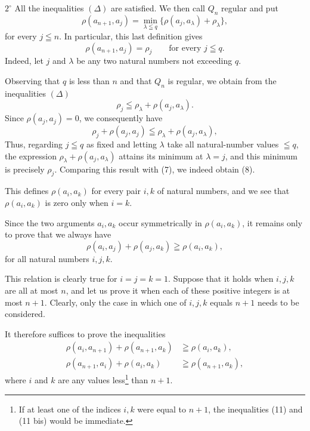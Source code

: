 \documentclass[a4paper,12pt]{amsart}
\newcommand{\srcpage}[1]{} %
\begin{document}
$2^\circ$ All the inequalities $(\Delta)$ are satisfied. We then call $Q_n$ regular and put
\begin{equation}\tag{7}
\rho(a_{n+1},a_j)=\min_{\lambda\leqq q}\{\rho(a_j,a_\lambda)+\rho_\lambda\},
\end{equation}
for every $j\leqq n$. In particular, this last definition gives
\begin{equation}\tag{8}
\rho(a_{n+1},a_j)=\rho_j\qquad\text{for every }j\leqq q.
\end{equation}
Indeed, let $j$ and $\lambda$ be any two natural numbers not exceeding $q$.

Observing that $q$ is less than $n$ and that $Q_n$ is regular, we obtain from the inequalities $(\Delta)$
\begin{equation}\tag{9}
\rho_j\leqq\rho_\lambda+\rho(a_j,a_\lambda).
\end{equation}
Since $\rho(a_j,a_j)=0$, we consequently have
\begin{equation}\tag{9 bis}
\rho_j+\rho(a_j,a_j)\leqq\rho_\lambda+\rho(a_j,a_\lambda),
\end{equation}
Thus, regarding $j\leqq q$ as fixed and letting $\lambda$ take all natural-number values $\leqq q$, the expression $\rho_\lambda+\rho(a_j,a_\lambda)$ attains its minimum at $\lambda=j$, and this minimum is precisely $\rho_j$. Comparing this result with (7), we indeed obtain (8).

This defines $\rho(a_i,a_k)$ for every pair $i,k$ of natural numbers, and we see that $\rho(a_i,a_k)$ is zero only when $i=k$.

Since the two arguments $a_i,a_k$ occur symmetrically in $\rho(a_i,a_k)$, it remains only to prove that we always have
\begin{equation}\tag{10}
\rho(a_i,a_j)+\rho(a_j,a_k)\geqq\rho(a_i,a_k),
\end{equation}
for all natural numbers $i,j,k$.

This relation is clearly true for $i=j=k=1$. Suppose that it holds when $i,j,k$ are all at most $n$, and let us prove it when each of these positive integers is at most $n+1$. Clearly, only the case in which one of $i,j,k$ equals $n+1$ needs to be considered.
\srcpage{55}
It therefore suffices to prove the inequalities
\begin{align}
\rho(a_i,a_{n+1})+\rho(a_{n+1},a_k)&\geqq\rho(a_i,a_k),\tag{11}\\
\rho(a_{n+1},a_i)+\rho(a_i,a_k)&\geqq\rho(a_{n+1},a_k),\tag{11 bis}
\end{align}
where $i$ and $k$ are any values less\footnote{If at least one of the indices $i,k$ were equal to $n+1$, the inequalities (11) and (11 bis) would be immediate.} than $n+1$.
\end{document}
